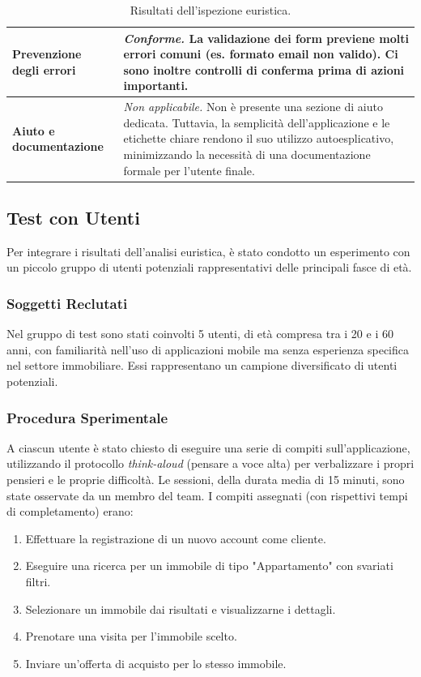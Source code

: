 \documentclass{book}
\begin{document}
\begin{table}[H]
\begin{tabularx}{\linewidth}{|p{3cm}|X|}
        \hline
        \textbf{Prevenzione degli errori} & \textit{Conforme.} La validazione dei form previene molti errori comuni (es. formato email non valido). Ci sono inoltre controlli di conferma prima di azioni importanti. \\
        \hline
        \textbf{Aiuto e documentazione} & \textit{Non applicabile.} Non è presente una sezione di aiuto dedicata. Tuttavia, la semplicità dell'applicazione e le etichette chiare rendono il suo utilizzo autoesplicativo, minimizzando la necessità di una documentazione formale per l'utente finale. \\
        \hline
    \end{tabularx}
    \caption{Risultati dell'ispezione euristica.}
    \label{tab:euristiche}
\end{table}

\subsection{Test con Utenti}
Per integrare i risultati dell'analisi euristica, è stato condotto un esperimento con un piccolo gruppo di utenti potenziali rappresentativi delle principali fasce di età.

\subsubsection{Soggetti Reclutati}
Nel gruppo di test sono stati coinvolti 5 utenti, di età compresa tra i 20 e i 60 anni, con familiarità nell'uso di applicazioni mobile ma senza esperienza specifica nel settore immobiliare. Essi rappresentano un campione diversificato di utenti potenziali.

\subsubsection{Procedura Sperimentale}
A ciascun utente è stato chiesto di eseguire una serie di compiti sull'applicazione, utilizzando il protocollo \textit{think-aloud} (pensare a voce alta) per verbalizzare i propri pensieri e le proprie difficoltà. Le sessioni, della durata media di 15 minuti, sono state osservate da un membro del team. I compiti assegnati (con rispettivi tempi di completamento) erano:
\begin{enumerate}
    \item Effettuare la registrazione di un nuovo account come cliente.
    \item Eseguire una ricerca per un immobile di tipo "Appartamento" con svariati filtri.
    \item Selezionare un immobile dai risultati e visualizzarne i dettagli.
    \item Prenotare una visita per l'immobile scelto.
    \item Inviare un'offerta di acquisto per lo stesso immobile.
\end{enumerate}
\end{document}
